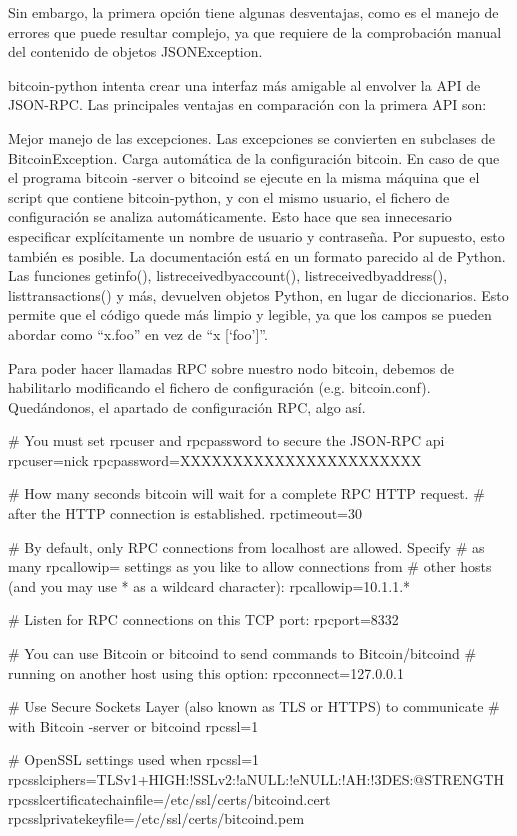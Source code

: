 \documentclass[a4paper, 12pt]{book}
\begin{document}
Sin embargo, la primera opción tiene algunas desventajas, como es el manejo de errores que puede resultar complejo, ya que requiere de la comprobación manual del contenido de objetos JSONException.

bitcoin-python intenta crear una interfaz más amigable al envolver la API de JSON-RPC. Las principales ventajas en comparación con la primera API son:

    Mejor manejo de las excepciones. Las excepciones se convierten en subclases de BitcoinException.
    Carga automática de la configuración bitcoin. En caso de que el programa bitcoin -server o bitcoind se ejecute en la misma máquina que el script que contiene bitcoin-python, y con el mismo usuario, el fichero de configuración se analiza automáticamente. Esto hace que sea innecesario especificar explícitamente un nombre de usuario y contraseña. Por supuesto, esto también es posible.
    La documentación está en un formato parecido al de Python.
    Las funciones getinfo(), listreceivedbyaccount(), listreceivedbyaddress(), listtransactions() y más, devuelven objetos Python, en lugar de diccionarios. Esto permite que el código quede más limpio y legible, ya que los campos se pueden abordar como “x.foo” en vez de “x [‘foo’]”.

Para poder hacer llamadas RPC sobre nuestro nodo bitcoin, debemos de habilitarlo modificando el fichero de configuración (e.g. bitcoin.conf). Quedándonos, el apartado de configuración RPC, algo así.

# You must set rpcuser and rpcpassword to secure the JSON-RPC api
rpcuser=nick
rpcpassword=XXXXXXXXXXXXXXXXXXXXXXX
 
# How many seconds bitcoin will wait for a complete RPC HTTP request.
# after the HTTP connection is established.
rpctimeout=30
 
# By default, only RPC connections from localhost are allowed.  Specify
# as many rpcallowip= settings as you like to allow connections from
# other hosts (and you may use * as a wildcard character):
rpcallowip=10.1.1.*
 
# Listen for RPC connections on this TCP port:
rpcport=8332
 
# You can use Bitcoin or bitcoind to send commands to Bitcoin/bitcoind
# running on another host using this option:
rpcconnect=127.0.0.1
 
# Use Secure Sockets Layer (also known as TLS or HTTPS) to communicate
# with Bitcoin -server or bitcoind
rpcssl=1
 
# OpenSSL settings used when rpcssl=1
rpcsslciphers=TLSv1+HIGH:!SSLv2:!aNULL:!eNULL:!AH:!3DES:@STRENGTH
rpcsslcertificatechainfile=/etc/ssl/certs/bitcoind.cert
rpcsslprivatekeyfile=/etc/ssl/certs/bitcoind.pem
\end{document}
